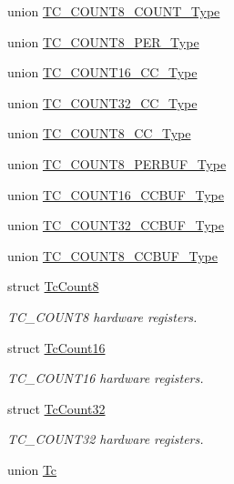 \begin{DoxyCompactItemize}
\item 
union \hyperlink{union_t_c___c_o_u_n_t8___c_o_u_n_t___type}{T\+C\+\_\+\+C\+O\+U\+N\+T8\+\_\+\+C\+O\+U\+N\+T\+\_\+\+Type}
\item 
union \hyperlink{union_t_c___c_o_u_n_t8___p_e_r___type}{T\+C\+\_\+\+C\+O\+U\+N\+T8\+\_\+\+P\+E\+R\+\_\+\+Type}
\item 
union \hyperlink{union_t_c___c_o_u_n_t16___c_c___type}{T\+C\+\_\+\+C\+O\+U\+N\+T16\+\_\+\+C\+C\+\_\+\+Type}
\item 
union \hyperlink{union_t_c___c_o_u_n_t32___c_c___type}{T\+C\+\_\+\+C\+O\+U\+N\+T32\+\_\+\+C\+C\+\_\+\+Type}
\item 
union \hyperlink{union_t_c___c_o_u_n_t8___c_c___type}{T\+C\+\_\+\+C\+O\+U\+N\+T8\+\_\+\+C\+C\+\_\+\+Type}
\item 
union \hyperlink{union_t_c___c_o_u_n_t8___p_e_r_b_u_f___type}{T\+C\+\_\+\+C\+O\+U\+N\+T8\+\_\+\+P\+E\+R\+B\+U\+F\+\_\+\+Type}
\item 
union \hyperlink{union_t_c___c_o_u_n_t16___c_c_b_u_f___type}{T\+C\+\_\+\+C\+O\+U\+N\+T16\+\_\+\+C\+C\+B\+U\+F\+\_\+\+Type}
\item 
union \hyperlink{union_t_c___c_o_u_n_t32___c_c_b_u_f___type}{T\+C\+\_\+\+C\+O\+U\+N\+T32\+\_\+\+C\+C\+B\+U\+F\+\_\+\+Type}
\item 
union \hyperlink{union_t_c___c_o_u_n_t8___c_c_b_u_f___type}{T\+C\+\_\+\+C\+O\+U\+N\+T8\+\_\+\+C\+C\+B\+U\+F\+\_\+\+Type}
\item 
struct \hyperlink{struct_tc_count8}{Tc\+Count8}
\begin{DoxyCompactList}\small\item\em T\+C\+\_\+\+C\+O\+U\+N\+T8 hardware registers. \end{DoxyCompactList}\item 
struct \hyperlink{struct_tc_count16}{Tc\+Count16}
\begin{DoxyCompactList}\small\item\em T\+C\+\_\+\+C\+O\+U\+N\+T16 hardware registers. \end{DoxyCompactList}\item 
struct \hyperlink{struct_tc_count32}{Tc\+Count32}
\begin{DoxyCompactList}\small\item\em T\+C\+\_\+\+C\+O\+U\+N\+T32 hardware registers. \end{DoxyCompactList}\item 
union \hyperlink{union_tc}{Tc}
\end{DoxyCompactItemize}
